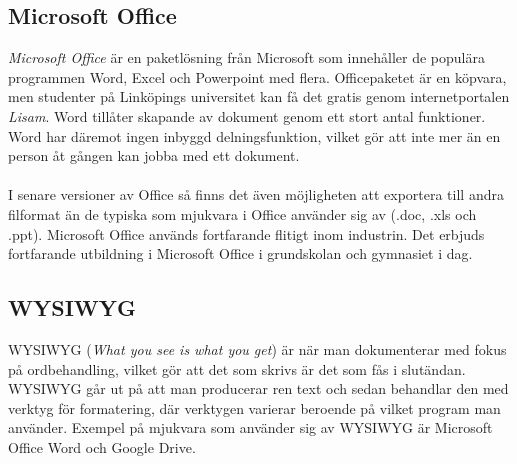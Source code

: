 \subsection{Microsoft Office}
\textit{Microsoft Office} är en paketlösning från Microsoft som innehåller de populära programmen Word, Excel och Powerpoint med flera. Officepaketet är en köpvara, men studenter på Linköpings universitet kan få det gratis genom internetportalen \textit{Lisam}. \cite{website:liu_office_package} Word tillåter skapande av dokument genom ett stort antal funktioner. Word har däremot ingen inbyggd delningsfunktion, vilket gör att inte mer än en person åt gången kan jobba med ett dokument.
\\ \\
I senare versioner av Office så finns det även möjligheten att exportera till andra filformat än de typiska som mjukvara i Office använder sig av (.doc, .xls och .ppt). 
Microsoft Office används fortfarande flitigt inom industrin. Det erbjuds fortfarande utbildning i Microsoft Office i grundskolan och gymnasiet i dag.

\subsection{WYSIWYG}
WYSIWYG (\textit{What you see is what you get}) är när man dokumenterar med fokus på ordbehandling, vilket gör att det som skrivs är det som fås i slutändan. WYSIWYG går ut på att man producerar ren text och sedan behandlar den med verktyg för formatering, där verktygen varierar beroende på vilket program man använder. Exempel på mjukvara som använder sig av WYSIWYG är Microsoft Office Word och Google Drive.


